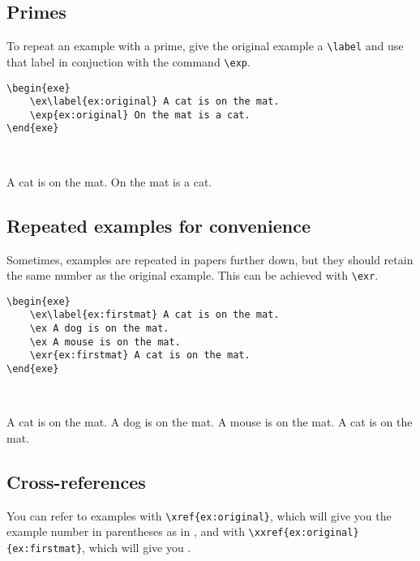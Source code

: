 \documentclass[output=paper]{langscibook}
\newcommand{\cmd}[1]{\texttt{\textbackslash#1}}
\begin{document}
\subsection{Primes}
To repeat an example with a prime, give the original example a \cmd{label} and use that label in conjuction with the command \cmd{exp}.

\noindent
\begin{minipage}[t]{.67\textwidth}
\begin{lstlisting}
\begin{exe}
    \ex\label{ex:original} A cat is on the mat.
    \exp{ex:original} On the mat is a cat.
\end{exe}
 \end{lstlisting}
\end{minipage}~
\parbox[t]{.33\textwidth}{
\begin{exe}
    \ex \label{ex:original} A cat is on the mat.
     On the mat is a cat.
\end{exe}
}

\subsection{Repeated examples for convenience}
Sometimes, examples are repeated in papers further down, but they should retain the same number as the original example. This can be achieved with \cmd{exr}.


\noindent
\begin{minipage}[t]{.55\textwidth}
\begin{lstlisting}
\begin{exe}
    \ex\label{ex:firstmat} A cat is on the mat. 
    \ex A dog is on the mat. 
    \ex A mouse is on the mat. 
    \exr{ex:firstmat} A cat is on the mat. 
\end{exe}
 \end{lstlisting}
\end{minipage}~
\parbox[t]{.45\textwidth}{
\begin{exe}
    \ex\label{ex:firstmat} A cat is on the mat. 
    \ex A dog is on the mat. 
    \ex A mouse is on the mat. 
     A cat is on the mat. 
\end{exe}
}


\subsection{Cross-references}
You can refer to examples with \cmd{xref\{ex:original\}}, which will give you the example number in parentheses as in , and with \cmd{xxref\{ex:original\}\{ex:firstmat\}}, which will give you .
\end{document}
